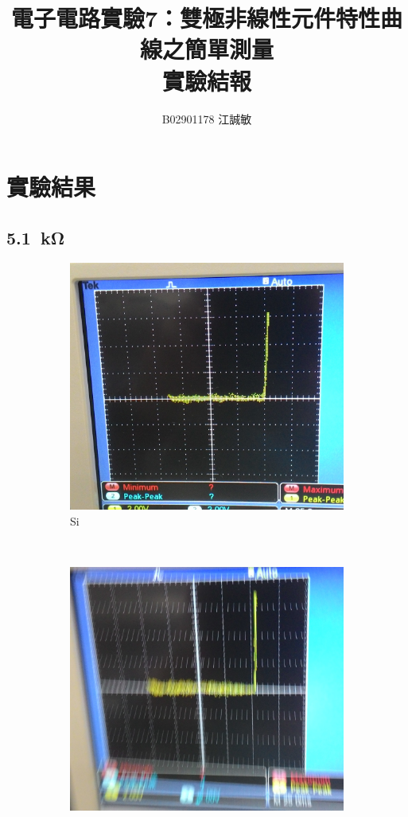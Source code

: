 \documentclass[12pt, a4paper]{article}
\title{ \bf {\Huge 電子電路實驗7：雙極非線性元件特性曲線之簡單測量}\\ 實驗結報}
\author{B02901178 江誠敏}
\begin{document}
\maketitle


\section{實驗結果}
\subsection{\SI{5.1}\kohm}
\begin{figure}[H]
  \centering
  \begin{subfigure}[b]{0.45\textwidth}
    \includegraphics[width=1\textwidth]{img/P1.jpg}
    \caption{Si}
  \end{subfigure}
  ~
  \begin{subfigure}[b]{0.45\textwidth}
    \includegraphics[width=1\textwidth]{img/P2.jpg}

\end{subfigure}
\end{figure}
\end{document}
